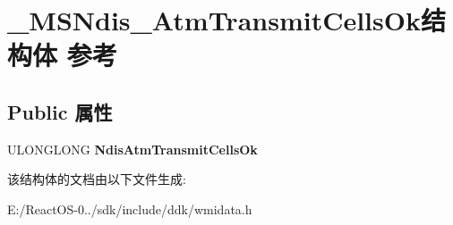 \hypertarget{struct___m_s_ndis___atm_transmit_cells_ok}{}\section{\+\_\+\+M\+S\+Ndis\+\_\+\+Atm\+Transmit\+Cells\+Ok结构体 参考}
\label{struct___m_s_ndis___atm_transmit_cells_ok}
\subsection*{Public 属性}
\begin{DoxyCompactItemize}
\item 
\mbox{\label{struct___m_s_ndis___atm_transmit_cells_ok_a5c9856358f0ed93c63a75ec0f44aeaee}} 
U\+L\+O\+N\+G\+L\+O\+NG {\bfseries Ndis\+Atm\+Transmit\+Cells\+Ok}
\end{DoxyCompactItemize}


该结构体的文档由以下文件生成\+:\begin{DoxyCompactItemize}
\item 
E\+:/\+React\+O\+S-\/0../sdk/include/ddk/wmidata.\+h\end{DoxyCompactItemize}
